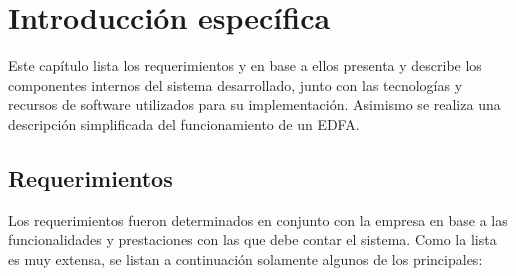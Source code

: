 \chapter{Introducción específica} %

\label{Chapter2}


Este capítulo lista los requerimientos y en base a ellos presenta y describe los componentes internos del sistema desarrollado, junto con las tecnologías y recursos de software utilizados para su implementación. Asimismo se realiza una descripción simplificada del funcionamiento de un EDFA.

\section{Requerimientos}

Los requerimientos fueron determinados en conjunto con la empresa en base a las funcionalidades y prestaciones con las que debe contar el sistema. Como la lista es muy extensa, se listan a continuación solamente algunos de los principales:

\renewcommand{\labelenumii}{\arabic{enumi}.\arabic{enumii}}


